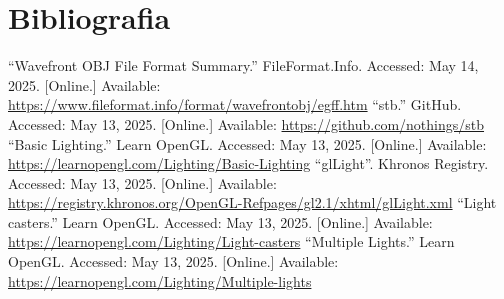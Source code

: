\documentclass[12pt, a4paper]{article}
\begin{document}
\begingroup
\section{Bibliografia}
\renewcommand{\section}[2]{}

\begin{thebibliography}{9}
        ``Wavefront OBJ File Format Summary.''{} FileFormat.Info. Accessed: May 14, 2025. [Online.]
        Available: \url{https://www.fileformat.info/format/wavefrontobj/egff.htm}
        ``stb.'' GitHub. Accessed: May 13, 2025. [Online.] Available:
        \url{https://github.com/nothings/stb}
        ``Basic Lighting.'' Learn OpenGL. Accessed: May 13, 2025. [Online.] Available:
        \url{https://learnopengl.com/Lighting/Basic-Lighting}
        ``glLight''. Khronos Registry. Accessed: May 13, 2025. [Online.] Available:
        \url{https://registry.khronos.org/OpenGL-Refpages/gl2.1/xhtml/glLight.xml}
        ``Light casters.'' Learn OpenGL. Accessed: May 13, 2025. [Online.] Available:
        \url{https://learnopengl.com/Lighting/Light-casters}
        ``Multiple Lights.'' Learn OpenGL. Accessed: May 13, 2025. [Online.] Available:
        \url{https://learnopengl.com/Lighting/Multiple-lights}
\end{thebibliography}
\endgroup
\end{document}
